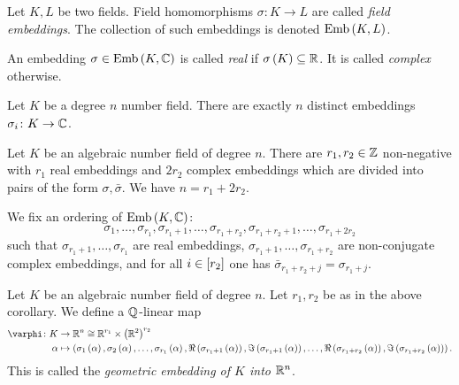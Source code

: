\documentclass[11pt]{karticle}
\begin{document}
\begin{definition}
Let $K,L$ be two fields. Field homomorphisms $\sigma \colon K \to L$ are called \emph{field embeddings}.
The collection of such embeddings is denoted
$\mathrm{Emb}\left( K,L \right)$.
\end{definition}

\begin{definition}
An embedding $\sigma \in \mathrm{Emb}\left( K,\mathbb{C} \right)$ is called \emph{real} if $\sigma\left( K \right) \subseteq \mathbb{R}$.
It is called \emph{complex} otherwise.
\end{definition}

\begin{theorem}
Let $K$ be a degree $n$ number field. There are exactly $n$ distinct embeddings $\sigma_i \colon K \to \mathbb{C}$.
\end{theorem}

\begin{corollary}
Let $K$ be an algebraic number field of degree $n$.
There are $r_1, r_2 \in \mathbb{Z}$ non-negative with $r_1$ real embeddings and $2 r_2$ complex embeddings which are divided into pairs of the form $\sigma, \bar{\sigma}$. We have $n = r_1 + 2 r_2$.

We fix an ordering of $\mathrm{Emb}\left( K,\mathbb{C} \right)$:
\[\sigma_1, \ldots, \sigma_{r_1}, \sigma_{r_1 + 1}, \ldots, \sigma_{r_1 + r_2}, \sigma_{r_1 + r_2 + 1}, \ldots, \sigma_{r_1 + 2 r_2}\]
such that $\sigma_{r_1 + 1}, \ldots, \sigma_{r_1}$ are real embeddings, $\sigma_{r_1 + 1}, \ldots, \sigma_{r_1 + r_2}$ are non-conjugate complex embeddings, and for all $i \in \left[ r_2 \right]$ one has $\bar{\sigma}_{r_1 + r_2 + j} = \sigma_{r_1 + j}$.
\end{corollary}

\begin{definition}
Let $K$ be an algebraic number field of degree $n$. Let $r_1, r_2$ be as in the above corollary.
We define a $\mathbb{Q}$-linear map
\begin{align*}
\varphi \colon K &\to \mbb{R}^n \cong \mbb{R}^{r_1} \times \prs{\mbb{R}^2}^{r_2} \\
\alpha &\mapsto \prs{\sigma_1\prs{\alpha}, \sigma_2\prs{\alpha}, \ldots, \sigma_{r_1}\prs{\alpha}, \Re\prs{\sigma_{r_1 + 1}\prs{\alpha}}, \Im\prs{\sigma_{r_1 + 1}\prs{\alpha}}, \ldots, \Re\prs{\sigma_{r_1 + r_2}\prs{\alpha}}, \Im\prs{\sigma_{r_1 + r_2}\prs{\alpha}}} \text{.}
\end{align*}
This is called the \emph{geometric embedding of $K$ into $\mathbb{R}^n$}.
\end{definition}
\end{document}
